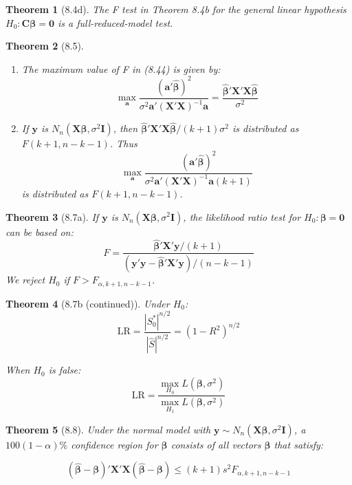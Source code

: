 \documentclass{article}
\newtheorem{theorem}{Theorem}[section]
\begin{document}
\begin{theorem}[8.4d]
The F test in Theorem 8.4b for the general linear hypothesis $H_0: \mathbf{C}\boldsymbol{\beta} = \mathbf{0}$ is a full-reduced-model test.
\end{theorem}

\begin{theorem}[8.5]
\begin{enumerate}[label=(\roman*)]
\item The maximum value of F in (8.44) is given by:
\[\max_{\mathbf{a}} \frac{(\mathbf{a}'\hat{\boldsymbol{\beta}})^2}{\sigma^2\mathbf{a}'(\mathbf{X}'\mathbf{X})^{-1}\mathbf{a}} = \frac{\hat{\boldsymbol{\beta}}'\mathbf{X}'\mathbf{X}\hat{\boldsymbol{\beta}}}{\sigma^2}\]
\item If $\mathbf{y}$ is $N_n(\mathbf{X}\boldsymbol{\beta}, \sigma^2\mathbf{I})$, then $\hat{\boldsymbol{\beta}}'\mathbf{X}'\mathbf{X}\hat{\boldsymbol{\beta}}/(k+1)\sigma^2$ is distributed as $F(k+1,n-k-1)$. Thus
\[\max_{\mathbf{a}} \frac{(\mathbf{a}'\hat{\boldsymbol{\beta}})^2}{\sigma^2\mathbf{a}'(\mathbf{X}'\mathbf{X})^{-1}\mathbf{a}(k+1)}\]
is distributed as $F(k+1,n-k-1)$.
\end{enumerate}
\end{theorem}

\begin{theorem}[8.7a]
If $\mathbf{y}$ is $N_n(\mathbf{X}\boldsymbol{\beta}, \sigma^2\mathbf{I})$, the likelihood ratio test for $H_0:\boldsymbol{\beta} = \mathbf{0}$ can be based on:
\[F = \frac{\hat{\boldsymbol{\beta}}'\mathbf{X}'\mathbf{y}/(k+1)}{(\mathbf{y}'\mathbf{y} - \hat{\boldsymbol{\beta}}'\mathbf{X}'\mathbf{y})/(n-k-1)}\]
We reject $H_0$ if $F > F_{\alpha,k+1,n-k-1}$.
\end{theorem}

\begin{theorem}[8.7b (continued)]
Under $H_0$:
\[\text{LR} = \frac{|S^*_0|^{n/2}}{|\hat{S}|^{n/2}} = (1-R^2)^{n/2}\]

When $H_0$ is false:
\[\text{LR} = \frac{\max_{H_0} L(\boldsymbol{\beta},\sigma^2)}{\max_{H_1} L(\boldsymbol{\beta},\sigma^2)}\]
\end{theorem}

\begin{theorem}[8.8]
Under the normal model with $\mathbf{y} \sim N_n(\mathbf{X}\boldsymbol{\beta}, \sigma^2\mathbf{I})$, a $100(1-\alpha)\%$ confidence region for $\boldsymbol{\beta}$ consists of all vectors $\boldsymbol{\beta}$ that satisfy:

\[(\hat{\boldsymbol{\beta}} - \boldsymbol{\beta})'\mathbf{X}'\mathbf{X}(\hat{\boldsymbol{\beta}} - \boldsymbol{\beta}) \leq (k+1)s^2F_{\alpha,k+1,n-k-1}\]
\end{theorem}
\end{document}
